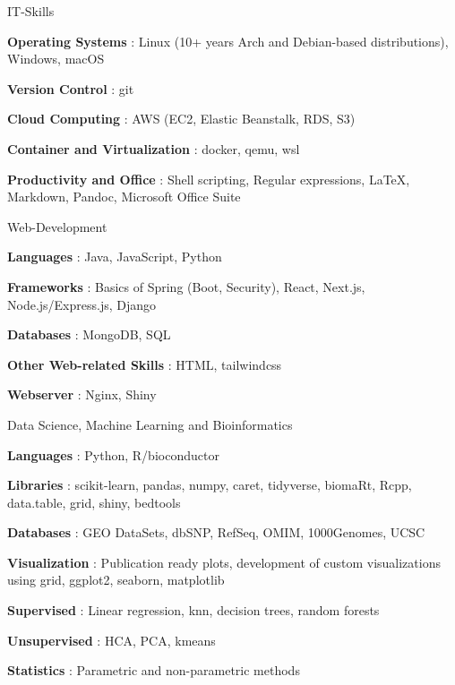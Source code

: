 \begin{cvskills}

    \cvskill
        { IT-Skills }
        {
            \begin{cvitems}
                \item {\textbf{ Operating Systems }: Linux (10+ years Arch and Debian-based distributions), Windows, macOS}
                \item {\textbf{ Version Control }: git}
                \item {\textbf{ Cloud Computing }: AWS (EC2, Elastic Beanstalk, RDS, S3)}
                \item {\textbf{ Container and Virtualization }: docker, qemu, wsl}
                \item {\textbf{ Productivity and Office }: Shell scripting, Regular expressions, LaTeX, Markdown, Pandoc, Microsoft Office Suite}
                
            \end{cvitems}
        }

    \cvskill
        { Web-Development }
        {
            \begin{cvitems}
                \item {\textbf{ Languages }: Java, JavaScript, Python}
                \item {\textbf{ Frameworks }: Basics of Spring (Boot, Security), React, Next.js, Node.js/Express.js, Django}
                \item {\textbf{ Databases }: MongoDB, SQL}
                \item {\textbf{ Other Web-related Skills }: HTML, tailwindcss}
                \item {\textbf{ Webserver }: Nginx, Shiny}
                
            \end{cvitems}
        }

    \cvskill
        { Data Science, Machine Learning and Bioinformatics }
        {
            \begin{cvitems}
                \item {\textbf{ Languages }: Python, R/bioconductor}
                \item {\textbf{ Libraries }: scikit-learn, pandas, numpy, caret, tidyverse, biomaRt, Rcpp, data.table, grid, shiny, bedtools}
                \item {\textbf{ Databases }: GEO DataSets, dbSNP, RefSeq, OMIM, 1000Genomes, UCSC}
                \item {\textbf{ Visualization }: Publication ready plots, development of custom visualizations using grid, ggplot2, seaborn, matplotlib}
                \item {\textbf{ Supervised }: Linear regression, knn, decision trees, random forests}
                \item {\textbf{ Unsupervised }: HCA, PCA, kmeans}
                \item {\textbf{ Statistics }: Parametric and non-parametric methods}
                

\end{cvitems}}
\end{cvskills}

